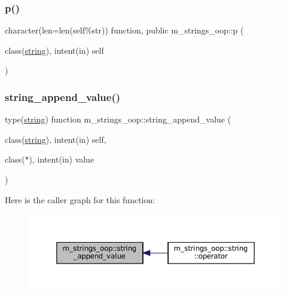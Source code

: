 \mbox{\label{namespacem__strings__oop_a456e651940e317c7bc885d95458c7fcb}} 
\subsubsection{\texorpdfstring{p()}{p()}}
{\footnotesize\ttfamily character(len=len(self\%str)) function, public m\+\_\+strings\+\_\+oop\+::p (\begin{DoxyParamCaption}\item[{class(\mbox{\hyperlink{structm__strings__oop_1_1string}{string}}), intent(in)}]{self }\end{DoxyParamCaption})}

\mbox{\label{namespacem__strings__oop_a64192a93804fcb61ca59725245ee85c2}} 
\subsubsection{\texorpdfstring{string\+\_\+append\+\_\+value()}{string\_append\_value()}}
{\footnotesize\ttfamily type(\mbox{\hyperlink{structm__strings__oop_1_1string}{string}}) function m\+\_\+strings\+\_\+oop\+::string\+\_\+append\+\_\+value (\begin{DoxyParamCaption}\item[{class(\mbox{\hyperlink{structm__strings__oop_1_1string}{string}}), intent(in)}]{self,  }\item[{class($\ast$), intent(in)}]{value }\end{DoxyParamCaption})\hspace{0.3cm}{\ttfamily [private]}}

Here is the caller graph for this function\+:\nopagebreak
\begin{figure}[H]
\begin{center}
\leavevmode
\includegraphics[width=350pt]{namespacem__strings__oop_a64192a93804fcb61ca59725245ee85c2_icgraph}
\end{center}
\end{figure}
\mbox{\label{namespacem__strings__oop_a0ec84db43ac789bfc02f46f933a3fc9f}} 
